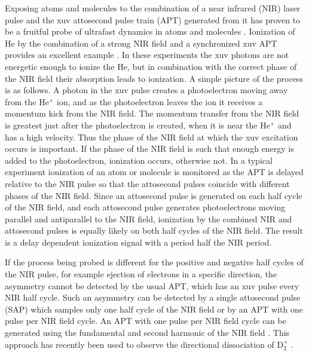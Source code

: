 \documentclass[aps,pra,reprint,groupedaddress]{revtex4-1}
\begin{document}
Exposing atoms and molecules to the combination of a near infrared (NIR) laser pulse and the xuv attosecond pulse train (APT) generated from it has proven to be a fruitful probe of ultrafast dynamics in atoms and molecules \cite{Krausz}. Ionization of He by the combination of a strong NIR field and a synchronized xuv APT provides an excellent example \cite{Johnsson, Ranitovic, Tong}.  In these experiments the xuv photons are not energetic enough to ionize the He, but in combination with the correct phase of the NIR field their absorption leads to ionization. A simple picture of the process is as follows. A photon in the xuv pulse creates a photoelectron moving away from the He$^+$ ion, and as the photoelectron leaves the ion it receives a momentum kick from the NIR field. The momentum transfer from the NIR field is greatest just after the photoelectron is created, when it is near the He$^+$ and has a high velocity. Thus the phase of the NIR field at which the xuv excitation occurs is important. If the phase of the NIR field is such that enough energy is added to the photoelectron, ionization occurs, otherwise not. In a typical experiment ionization of an atom or molecule is monitored as the APT is delayed relative to the NIR pulse so that the attosecond pulses coincide with different phases of the NIR field. Since an attosecond  pulse is generated on each half cycle of the NIR field, and each attosecond pulse generates photoelectrons moving parallel and antiparallel to the NIR field, ionization by the combined NIR and attosecond pulses is equally likely on both half cycles of the NIR field. The result is a delay dependent ionization signal with a period half the NIR period.

If the process being probed is different for the positive and negative half cycles of the NIR pulse, for example ejection of electrons in a specific direction, the asymmetry cannot be detected by the usual APT, which has an xuv pulse every NIR half cycle. Such an asymmetry can be detected by a single attosecond pulse (SAP) which samples only one half cycle of the NIR field or by an APT with one pulse per NIR field cycle. An APT with one pulse per NIR field cycle can be generated using the fundamental and second harmonic of the NIR field \cite{Mauritsson}. This approach has recently been used to observe the directional dissociation of D$_2^+$ \cite{Singh}.
\end{document}
